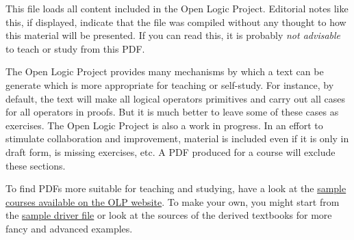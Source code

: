 \documentclass[../include/open-logic-part]{subfiles}
\begin{document}
\clearpage

\begin{editorial}
This file loads all content included in the Open Logic Project.
Editorial notes like this, if displayed, indicate that the file was
compiled without any thought to how this material will be presented.
If you can read this, it is probably \emph{not advisable} to teach or
study from this PDF. 

The Open Logic Project provides many mechanisms by which a text can be
generate which is more appropriate for teaching or self-study.  For
instance, by default, the text will make all logical operators
primitives and carry out all cases for all operators in proofs.  But
it is much better to leave some of these cases as exercises. The Open
Logic Project is also a work in progress. In an effort to stimulate
collaboration and improvement, material is included even if it is
only in draft form, is missing exercises, etc.  A PDF produced for a
course will exclude these sections.

To find PDFs more suitable for teaching and studying, have a look at
the \href{http://builds.openlogicproject.org/}{sample courses
  available on the OLP website}. To make your own, you might start
from the
\href{https://github.com/OpenLogicProject/OpenLogic/tree/master/courses/sample}{sample driver file} or look at the sources of the derived textbooks for
more fancy and advanced examples.
\end{editorial}















\end{document}
